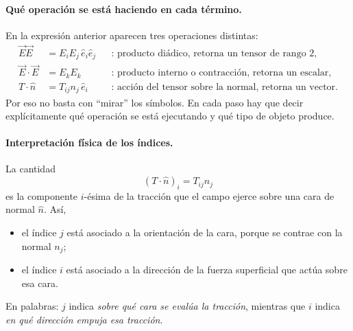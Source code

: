 \documentclass{article}
\numberwithin{equation}{section}
\newcommand{\Etot}{\vec E}
\newcommand{\trac}{\vec t^{\,(n)}}
\begin{document}
\paragraph{Qué operación se está haciendo en cada término.}
En la expresión anterior aparecen tres operaciones distintas:
\begin{align*}
\Etot\Etot &= E_iE_j\,\hat e_i\hat e_j
&& \text{: producto diádico, retorna un tensor de rango 2,}\\
\Etot\cdot\Etot &= E_kE_k
&& \text{: producto interno o contracción, retorna un escalar,}\\
T\cdot\hat n &= T_{ij}n_j\,\hat e_i
&& \text{: acción del tensor sobre la normal, retorna un vector.}
\end{align*}
Por eso no basta con ``mirar'' los símbolos. En cada paso hay que decir explícitamente qué operación se está ejecutando y qué tipo de objeto produce.



\paragraph{Interpretación física de los índices.}
La cantidad
\begin{equation*}
(T\cdot\hat n)_i=T_{ij}n_j
\end{equation*}
es la componente $i$-ésima de la tracción que el campo ejerce sobre una cara de normal $\hat n$. Así,
\begin{itemize}[leftmargin=1.5em]
    \item el índice $j$ está asociado a la orientación de la cara, porque se contrae con la normal $n_j$;
    \item el índice $i$ está asociado a la dirección de la fuerza superficial que actúa sobre esa cara.
\end{itemize}
En palabras: $j$ indica \emph{sobre qué cara se evalúa la tracción}, mientras que $i$ indica \emph{en qué dirección empuja esa tracción}.


\begin{center}
\begingroup
\shorthandoff{<>}
\endgroup
\end{center}
\end{document}
